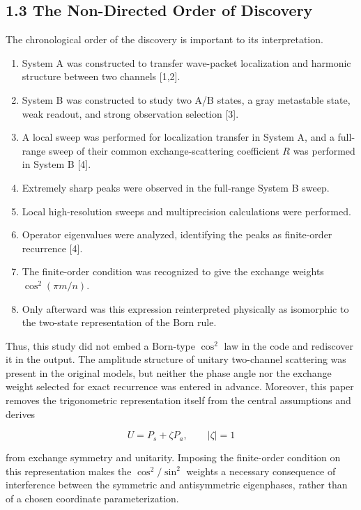 \documentclass[
  a4paper,
  10pt]{article}
\providecommand{\tightlist}{%
  \setlength{\itemsep}{0pt}\setlength{\parskip}{0pt}}
\begin{document}
\subsection{1.3 The Non-Directed Order of
Discovery}\label{13-the-non-directed-order-of-discovery}

The chronological order of the discovery is important to its
interpretation.

\begin{enumerate}
\def\labelenumi{\arabic{enumi}.}
\tightlist
\item
  System A was constructed to transfer wave-packet localization and
  harmonic structure between two channels {[}1,2{]}.
\item
  System B was constructed to study two A/B states, a gray metastable
  state, weak readout, and strong observation selection {[}3{]}.
\item
  A local sweep was performed for localization transfer in System A, and
  a full-range sweep of their common exchange-scattering coefficient
  \(R\) was performed in System B {[}4{]}.
\item
  Extremely sharp peaks were observed in the full-range System B sweep.
\item
  Local high-resolution sweeps and multiprecision calculations were
  performed.
\item
  Operator eigenvalues were analyzed, identifying the peaks as
  finite-order recurrence {[}4{]}.
\item
  The finite-order condition was recognized to give the exchange weights
  \(\cos^2(\pi m/n)\).
\item
  Only afterward was this expression reinterpreted physically as
  isomorphic to the two-state representation of the Born rule.
\end{enumerate}

Thus, this study did not embed a Born-type \(\cos^2\) law in the code
and rediscover it in the output. The amplitude structure of unitary
two-channel scattering was present in the original models, but neither
the phase angle nor the exchange weight selected for exact recurrence
was entered in advance. Moreover, this paper removes the trigonometric
representation itself from the central assumptions and derives

\[
U=P_s+\zeta P_a,
\qquad |\zeta|=1
\]

from exchange symmetry and unitarity. Imposing the finite-order
condition on this representation makes the \(\cos^2/\sin^2\) weights a
necessary consequence of interference between the symmetric and
antisymmetric eigenphases, rather than of a chosen coordinate
parameterization.
\end{document}
